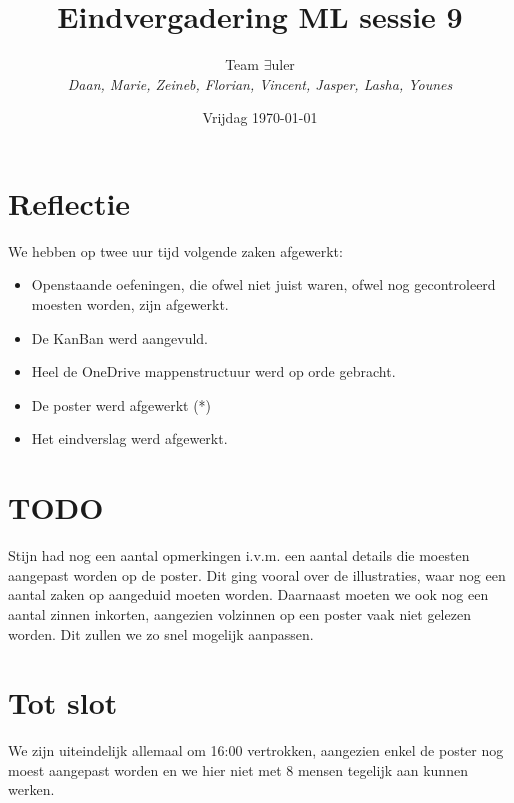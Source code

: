 \documentclass{article}
\title{Eindvergadering ML sessie 9}
\author{Team $\exists$uler\\
	\textit{Daan, Marie, Zeineb, Florian, Vincent, Jasper, Lasha, Younes}}
\date{Vrijdag \today}
\begin{document}
	
\maketitle

\section*{Reflectie}

We hebben op twee uur tijd volgende zaken afgewerkt:

\begin{itemize}
	\item Openstaande oefeningen, die ofwel niet juist waren, ofwel nog gecontroleerd moesten worden, zijn afgewerkt.
	\item De KanBan werd aangevuld.
	\item Heel de OneDrive mappenstructuur werd op orde gebracht.
	\item De poster werd afgewerkt (*)
	\item Het eindverslag werd afgewerkt.
\end{itemize}

\section*{TODO}
Stijn had nog een aantal opmerkingen i.v.m. een aantal details die moesten aangepast worden op de poster. Dit ging vooral over de illustraties, waar nog een aantal zaken op aangeduid moeten worden. Daarnaast moeten we ook nog een aantal zinnen inkorten, aangezien volzinnen op een poster vaak niet gelezen worden. Dit zullen we zo snel mogelijk aanpassen.

\section*{Tot slot}
We zijn uiteindelijk allemaal om 16:00 vertrokken, aangezien enkel de poster nog moest aangepast worden en we hier niet met 8 mensen tegelijk aan kunnen werken.
\end{document}
